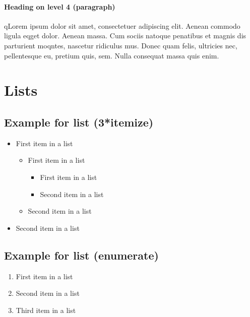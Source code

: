 \paragraph{Heading on level 4 (paragraph)}
qLorem ipsum dolor sit amet, consectetuer adipiscing elit. Aenean commodo ligula
eqget dolor. Aenean massa. Cum sociis natoque penatibus et magnis dis parturient
moqntes, nascetur ridiculus mus. Donec quam felis, ultricies nec, pellentesque
eu, pretium quis, sem. Nulla consequat massa quis enim.


\section{Lists}

\subsection{Example for list (3*itemize)}
\begin{itemize}
	\item First item in a list 
		\begin{itemize}
		\item First item in a list 
			\begin{itemize}
			\item First item in a list 
			\item Second item in a list 
			\end{itemize}
		\item Second item in a list 
		\end{itemize}
	\item Second item in a list 
\end{itemize}

\subsection{Example for list (enumerate)}
\begin{enumerate}
	\item First item in a list 
	\item Second item in a list 
	\item Third item in a list
\end{enumerate}
